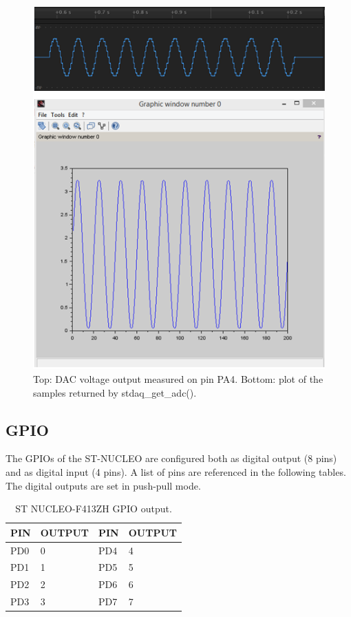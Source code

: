 \documentclass[letterpaper,10pt,english]{hitec}
\begin{document}
\begin{figure}[ht!]
\includegraphics[scale=0.8]{../img/adc_example.png}
\caption{Top: DAC voltage output measured on pin PA4. Bottom: plot of the samples returned by stdaq\_get\_adc().}
\label{fig:adc_example}
\end{figure}

\hrulefill

\subsection{GPIO}

The GPIOs of the ST-NUCLEO are configured both as digital output (8 pins) and as digital input (4 pins). A list of pins are referenced in the following tables.
The digital outputs are set in push-pull mode.

\begin{table}[h]
\caption{ST NUCLEO-F413ZH GPIO output.}
\centering
\begin{tabular}{|ll|ll|}
 \textbf{PIN} & \textbf{OUTPUT} & \textbf{PIN} & \textbf{OUTPUT} \\ \hline
 PD0 & 0 & PD4 & 4 \\
 PD1 & 1 & PD5 & 5 \\
 PD2 & 2 & PD6 & 6 \\
 PD3 & 3 & PD7 & 7 
\end{tabular}
\end{table}
\end{document}
